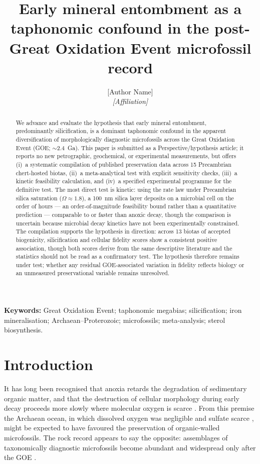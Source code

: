 \documentclass[11pt]{article}
\title{\vspace{-1.0cm}\textbf{Early mineral entombment as a taphonomic confound in the
post-Great Oxidation Event microfossil record}}
\author{[Author Name]\\
\small\textit{[Affiliation]}}
\date{}
\begin{document}
\maketitle

\begin{abstract}
\noindent We advance and evaluate the hypothesis that early mineral entombment, predominantly
silicification, is a dominant taphonomic confound in the apparent diversification of morphologically
diagnostic microfossils across the Great Oxidation Event (GOE; $\sim$2.4~Ga). This paper is submitted
as a Perspective/hypothesis article; it reports no new petrographic, geochemical, or experimental
measurements, but offers (i)~a systematic compilation of published preservation data across 15
Precambrian chert-hosted biotas, (ii)~a meta-analytical test with explicit sensitivity checks,
(iii)~a kinetic feasibility calculation, and (iv)~a specified experimental programme for the
definitive test. The most direct test is kinetic: using the \citet{Rimstidt1980} rate law under
Precambrian silica saturation ($\Omega \approx 1.8$), a 100~nm silica layer deposits on a microbial
cell on the order of hours --- an order-of-magnitude feasibility bound rather than a quantitative
prediction --- comparable to or faster than anoxic decay, though the comparison is uncertain because
microbial decay kinetics have not been experimentally constrained. The compilation supports the
hypothesis in direction: across 13 biotas of accepted biogenicity, silicification and cellular
fidelity scores show a consistent positive association, though both scores derive from the same
descriptive literature and the statistics should not be read as a confirmatory test. The hypothesis
therefore remains under test; whether any residual GOE-associated variation in fidelity reflects
biology or an unmeasured preservational variable remains unresolved.
\end{abstract}

\noindent\textbf{Keywords:} Great Oxidation Event; taphonomic megabias; silicification; iron
mineralisation; Archaean--Proterozoic; microfossils; meta-analysis; sterol biosynthesis.

\section{Introduction}

It has long been recognised that anoxia retards the degradation of sedimentary organic matter, and
that the destruction of cellular morphology during early decay proceeds more slowly where molecular
oxygen is scarce \citep{Canfield1994,Hedges1995}. From this premise the Archaean ocean, in which
dissolved oxygen was negligible \citep{Pavlov2002} and sulfate scarce \citep{Habicht2002,Crowe2014},
might be expected to have favoured the preservation of organic-walled microfossils. The rock record
appears to say the opposite: assemblages of taxonomically diagnostic microfossils become abundant
and widespread only after the GOE \citep{Javaux2018,Wacey2014}.
\end{document}
